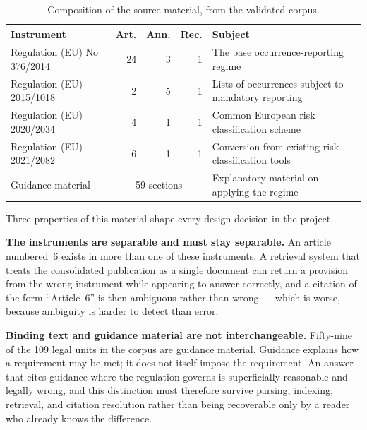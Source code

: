 \begin{table}[htbp]
  \centering
  \caption{Composition of the source material, from the validated corpus.}
  \label{tab:context-sources}
  \small
  \begin{tabularx}{\textwidth}{@{}l r r r X@{}}
    \toprule
    \textbf{Instrument} & \textbf{Art.} & \textbf{Ann.} & \textbf{Rec.} & \textbf{Subject} \\
    \midrule
    Regulation (EU) No 376/2014 & 24 & 3 & 1 & The base occurrence-reporting regime \\
    Regulation (EU) 2015/1018 & 2 & 5 & 1 & Lists of occurrences subject to mandatory reporting \\
    Regulation (EU) 2020/2034 & 4 & 1 & 1 & Common European risk classification scheme \\
    Regulation (EU) 2021/2082 & 6 & 1 & 1 & Conversion from existing risk-classification tools \\
    \midrule
    Guidance material & \multicolumn{3}{c}{59 sections} & Explanatory material on applying the regime \\
    \bottomrule
  \end{tabularx}
\end{table}

Three properties of this material shape every design decision in the project.

\textbf{The instruments are separable and must stay separable.} An article numbered~6 exists in more than one of these instruments. A retrieval system that treats the consolidated publication as a single document can return a provision from the wrong instrument while appearing to answer correctly, and a citation of the form ``Article~6'' is then ambiguous rather than wrong --- which is worse, because ambiguity is harder to detect than error.

\textbf{Binding text and guidance material are not interchangeable.} Fifty-nine of the 109 legal units in the corpus are guidance material. Guidance explains how a requirement may be met; it does not itself impose the requirement. An answer that cites guidance where the regulation governs is superficially reasonable and legally wrong, and this distinction must therefore survive parsing, indexing, retrieval, and citation resolution rather than being recoverable only by a reader who already knows the difference.

